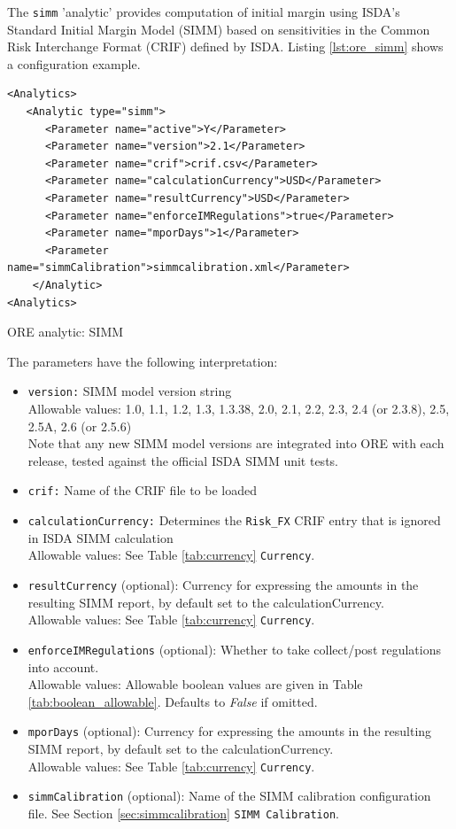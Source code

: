 \documentclass[12pt, a4paper]{article}
\begin{document}
\medskip The {\tt simm} 'analytic' provides computation of initial margin using ISDA's Standard Initial Margin Model (SIMM) based on sensitivities in the Common Risk Interchange Format (CRIF) defined by ISDA. Listing \ref{lst:ore_simm} shows a configuration example.

\begin{listing}[H]
\begin{verbatim}
<Analytics>
   <Analytic type="simm">
      <Parameter name="active">Y</Parameter>
      <Parameter name="version">2.1</Parameter>
      <Parameter name="crif">crif.csv</Parameter>
      <Parameter name="calculationCurrency">USD</Parameter>
      <Parameter name="resultCurrency">USD</Parameter>
      <Parameter name="enforceIMRegulations">true</Parameter>
      <Parameter name="mporDays">1</Parameter>
      <Parameter name="simmCalibration">simmcalibration.xml</Parameter>
    </Analytic>
<Analytics>
\end{verbatim}
\caption{ORE analytic: SIMM}
\label{lst:ore_simm}
\end{listing}

The parameters have the following interpretation:

\begin{itemize}
\item {\tt version:} SIMM model version string \\
Allowable values: 1.0, 1.1, 1.2, 1.3, 1.3.38, 2.0, 2.1, 2.2, 2.3, 2.4 (or 2.3.8), 2.5, 2.5A, 2.6 (or 2.5.6) \\
Note that any new SIMM model versions are integrated into ORE with each release, tested against the official ISDA SIMM unit tests.
\item {\tt crif:} Name of the CRIF file to be loaded
\item {\tt calculationCurrency:} Determines the {\tt Risk\_FX} CRIF entry that is ignored in ISDA SIMM calculation \\
Allowable values: See Table \ref{tab:currency} \lstinline!Currency!.
\item {\tt resultCurrency} (optional): Currency for expressing the amounts in the resulting SIMM report, by default set to the calculationCurrency. \\
Allowable values: See Table \ref{tab:currency} \lstinline!Currency!.
\item {\tt enforceIMRegulations} (optional): Whether to take collect/post regulations into account. \\
Allowable values: Allowable boolean values are given in Table \ref{tab:boolean_allowable}. Defaults to \emph{False} if omitted.
\item {\tt mporDays} (optional): Currency for expressing the amounts in the resulting SIMM report, by default set to the calculationCurrency. \\
Allowable values: See Table \ref{tab:currency} \lstinline!Currency!.
\item {\tt simmCalibration} (optional): Name of the SIMM calibration configuration file. See Section \ref{sec:simmcalibration} \lstinline!SIMM Calibration!.
\end{itemize}
\end{document}
